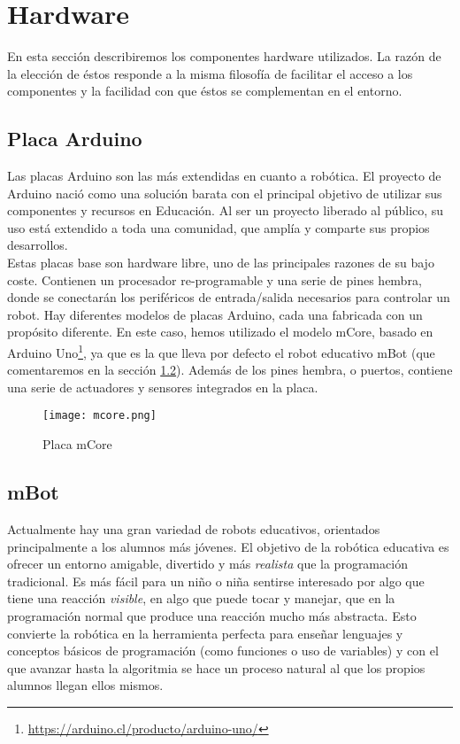 \section{Hardware}\label{sec:hardware}
En esta sección describiremos los componentes hardware utilizados. La razón de la elección de éstos responde a la misma filosofía de facilitar el acceso a los componentes y la facilidad con que éstos se complementan en el entorno.
\subsection{Placa Arduino}\label{subsec:placaBase}
Las placas Arduino son las más extendidas en cuanto a robótica. El proyecto de Arduino \cite{arduinoURL} nació como una solución barata con el principal objetivo de utilizar sus componentes y recursos en Educación. Al ser un proyecto liberado al público, su uso está extendido a toda una comunidad, que amplía y comparte sus propios desarrollos.\\
Estas placas base son hardware libre, uno de las principales razones de su bajo coste. Contienen un procesador re-programable y una serie de pines hembra, donde se conectarán los periféricos de entrada/salida necesarios para controlar un robot. Hay diferentes modelos de placas Arduino, cada una fabricada con un propósito diferente. En este caso, hemos utilizado el modelo mCore, basado en Arduino Uno\footnote{\href{https://arduino.cl/producto/arduino-uno/}{https://arduino.cl/producto/arduino-uno/}}, ya que es la que lleva por defecto el robot educativo mBot (que comentaremos en la sección \ref{subsec:mbot}). Además de los pines hembra, o puertos, contiene una serie de actuadores y sensores integrados en la placa.
\begin{figure}[H]
		\texttt{[image: mcore.png]}\centering
	\label{img:Mcore}
	\caption{Placa mCore}
\end{figure}
\subsection{mBot}\label{subsec:mbot}
Actualmente hay una gran variedad de robots educativos, orientados principalmente a los alumnos más jóvenes. El objetivo de la robótica educativa es ofrecer un entorno amigable, divertido y más \textit{realista} que la programación tradicional. Es más fácil para un niño o niña sentirse interesado por algo que tiene una reacción \textit{visible}, en algo que puede tocar y manejar, que en la programación normal que produce una reacción mucho más abstracta. Esto convierte la robótica en la herramienta perfecta para enseñar lenguajes y conceptos básicos de programación (como funciones o uso de variables) y con el que avanzar hasta la algoritmia se hace un proceso natural al que los propios alumnos llegan ellos mismos. \\

